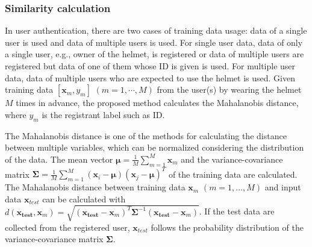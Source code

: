 \documentclass[sigchi,authordraft]{acmart}
\begin{document}
\subsubsection{Similarity calculation}
In user authentication, there are two cases of training data usage: data of a single user is used and data of multiple users is used. 
For single user data, data of only a single user, e.g., owner of the helmet, is registered or data of multiple users are registered but data of one of them whose ID is given is used. For multiple user data, data of multiple users who are expected to use the helmet is used. Given training data $[\bm{x}_m,y_m]$ $(m=1,\cdots, M)$ from the user(s) by wearing the helmet $M$ times in advance, the proposed method calculates the Mahalanobis distance, where $y_m$ is the registrant label such as ID. 

The Mahalanobis distance is one of the methods for calculating the distance between multiple variables, which can be normalized considering the distribution of the data.
The mean vector $\bm{\mu}=\frac{1}{M}\sum_{m=1}^{M}\bm{x}_m$ and the variance-covariance matrix $\bm{\Sigma}=\frac{1}{M}\sum_{m=1}^{M}(\bm{x}_i-\bm{\mu})(\bm{x}_j-\bm{\mu})^T$ of the training data are calculated. %
The Mahalanobis distance between training data $\bm{x}_m$ $(m=1,\dots, M)$ and input data $\bm{x}_{test}$ can be calculated with $  d(\bm{x_{test}},\bm{x}_m) = \sqrt{(\bm{x_{test}}-\bm{x}_m)^{T}\bm{\Sigma}^{-1}(\bm{x_{test}}-\bm{x}_m)}$.
If the test data are collected from the registered user, $\bm{x}_{test}$ follows the probability distribution of the variance-covariance matrix $\bm{\Sigma}$.
\end{document}
